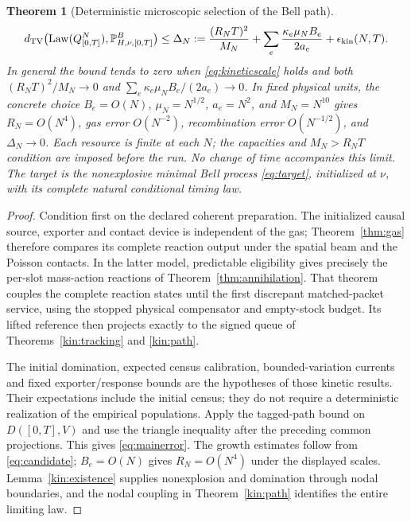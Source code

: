 \documentclass[11pt]{article}
\newtheorem{theorem}{Theorem}[section]
\theoremstyle{definition}\newtheorem{definition}[theorem]{Definition}
\theoremstyle{remark}\newtheorem{remark}[theorem]{Remark}
\newcommand{\Law}{\operatorname{Law}}\newcommand{\TV}{d_{\mathrm{TV}}}
\begin{document}
\begin{theorem}[Deterministic microscopic selection of the Bell path]
\begin{equation}
 \TV\bigl(\Law(Q^N_{[0,T]}),\mathbb P^B_{H,\nu,[0,T]}\bigr)
 \le \Delta_N:=\frac{(R_NT)^2}{M_N}
       +\sum_e\frac{\kappa_e\mu_NB_e}{2a_e}
       +\epsilon_{\rm kin}(N,T).
 \label{eq:mainerror}
\end{equation}
In general the bound tends to zero when
\eqref{eq:kineticscale} holds and both
$(R_NT)^2/M_N\to0$ and
$\sum_e\kappa_e\mu_NB_e/(2a_e)\to0$.
In fixed physical units, the concrete choice $B_e=O(N)$,
$\mu_N=N^{1/2}$, $a_e=N^2$, and $M_N=N^{10}$ gives
$R_N=O(N^4)$, gas error $O(N^{-2})$, recombination error
$O(N^{-1/2})$, and $\Delta_N\to0$. Each resource is finite at
each $N$; the capacities and $M_N>R_NT$ condition are imposed
before the run. No change of time accompanies this limit. The target
is the nonexplosive minimal Bell process \eqref{eq:target},
initialized at $\nu$, with its complete natural conditional timing law.
\end{theorem}
\begin{proof}
Condition first on the declared coherent preparation. The initialized
causal source, exporter and contact device is independent of the gas;
Theorem~\ref{thm:gas} therefore compares its complete reaction output
under the spatial beam and the Poisson contacts. In the latter model,
predictable eligibility gives precisely the per-slot mass-action
reactions of Theorem~\ref{thm:annihilation}. That theorem couples
the complete reaction states until the first discrepant matched-packet
service, using the stopped physical compensator and empty-stock
budget. Its lifted reference then projects exactly to the signed queue
of Theorems~\ref{kin:tracking} and \ref{kin:path}.

The initial domination, expected census calibration, bounded-variation
currents and fixed exporter/response bounds are the hypotheses of
those kinetic results. Their expectations include the initial census;
they do not require a deterministic realization of the empirical
populations. Apply the tagged-path bound on $D([0,T],V)$ and use
the triangle inequality after the preceding common projections. This
gives \eqref{eq:mainerror}. The growth estimates follow from
\eqref{eq:candidate}; $B_e=O(N)$ gives $R_N=O(N^4)$ under the
displayed scales. Lemma~\ref{kin:existence} supplies nonexplosion
and domination through nodal boundaries, and the nodal coupling in
Theorem~\ref{kin:path} identifies the entire limiting law.
\end{proof}
\end{document}
